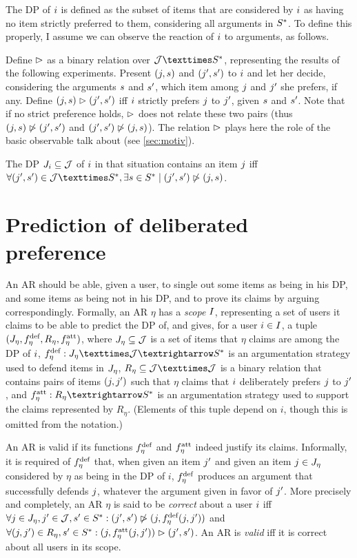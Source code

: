\documentclass[french, english]{da2pl2018}
\begin{document}
The \ac{DP} of $i$ is defined as the subset of items that are considered by $i$ as having no item strictly preferred to them, considering all arguments in $S^*$. To define this properly, I assume we can observe the reaction of $i$ to arguments, as follows. 

Define $\vartriangleright$ as a binary relation over $\allitems × \allargs$, representing the results of the following experiments. Present $(j, s)$ and $(j', s')$ to $i$ and let her decide, considering the arguments $s$ and $s'$, which item among $j$ and $j'$ she prefers, if any. 
Define $(j, s) \vartriangleright (j', s')$ iff $i$ strictly prefers $j$ to $j'$, given $s$ and $s'$. Note that if no strict preference holds, $\vartriangleright$ does not relate these two pairs (thus $(j, s) \not\vartriangleright (j', s')$ and $(j', s') \not\vartriangleright (j, s)$). 
The relation $\vartriangleright$ plays here the role of the basic observable \citeauthor{von_neumann_theory_1944} talk about (see \cref{sec:motiv}).

The \ac{DP} $J_i \subseteq \mathcal{J}$ of $i$ in that situation contains an item $j$ iff $\forall (\itm', \ar') \in \allitems × \allargs, \exists \ar \in \allargs \suchthat (\itm', \ar') \nibeats (\itm, \ar)$.

\section{Prediction of deliberated preference}
\label{sec:pred}
An \ac{AR} should be able, given a user, to single out some items as being in his \ac{DP}, and some items as being not in his \ac{DP}, and to prove its claims by arguing correspondingly. 
Formally, an \ac{AR} $\eta$ has a \emph{scope} $I$, representing a set of users it claims to be able to predict the \ac{DP} of, and gives, for a user $i \in I$, a tuple $(J_{\eta}, f^\text{def}_{\eta}, R_\eta, f^\text{att}_{\eta})$, where $J_{\eta} \subseteq \mathcal{J}$ is a set of items that $\eta$ claims are among the \ac{DP} of $i$, $\mdef: \mitems × \allitems → \allargs$ is an argumentation strategy used to defend items in $J_{\eta}$, $R_\eta \subseteq \allitems × \allitems$ is a binary relation that contains pairs of items $(j, j')$ such that $\eta$ claims that $i$ deliberately prefers $j$ to $j'$, and $\matt: R_\eta → \allargs$ is an argumentation strategy used to support the claims represented by $R_\eta$. (Elements of this tuple depend on $i$, though this is omitted from the notation.)

An \ac{AR} is valid if its functions $f^\text{def}_{\eta}$ and $f^\text{att}_{\eta}$ indeed justify its claims. Informally, it is required of $f^\text{def}_{\eta}$ that, when given an item $j'$ and given an item $j \in J_{\eta}$ considered by $\eta$ as being in the \ac{DP} of $i$, $f^\text{def}_{\eta}$ produces an argument that successfully defends $j$, whatever the argument given in favor of $j'$. More precisely and completely, an \ac{AR} $\eta$ is said to be \emph{correct} about a user $i$ iff $\forall j \in J_{\eta}, j' \in \mathcal{J}, s' \in S^*: (j', s') \not\vartriangleright (j, f^\text{def}_{\eta}(j, j'))$ and $\forall (j, j') \in R_\eta, s' \in S^*: (j, f^\text{att}_{\eta}(j, j')) \vartriangleright (j', s')$. An \ac{AR} is \emph{valid} iff it is correct about all users in its scope.
\end{document}
